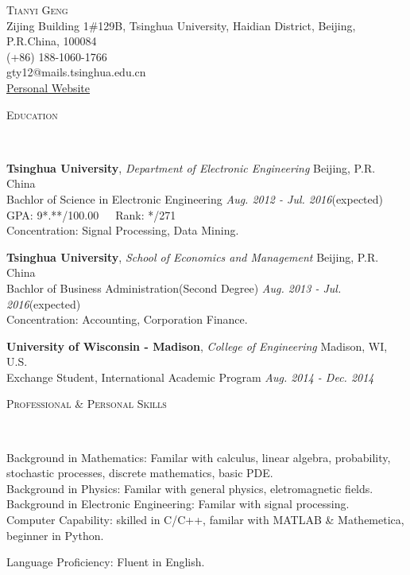 \documentclass[9pt]{article}
\newenvironment{changemargin}[2]{%
  \begin{list}{}{%
    \setlength{\topsep}{0pt}%
    \setlength{\leftmargin}{#1}%
    \setlength{\rightmargin}{#2}%
    \setlength{\listparindent}{\parindent}%
    \setlength{\itemindent}{\parindent}%
    \setlength{\parsep}{\parskip}%
  }%
  \item[]}{\end{list}
}
\newcommand{\lineover}{
	\begin{changemargin}{-0.05in}{-0.05in}
		\vspace*{-8pt}
		\hrulefill \\
		\vspace*{-2pt}
	\end{changemargin}
}
\newcommand{\header}[1]{
	\begin{changemargin}{-0.5in}{-0.5in}
		\scshape{#1}\\
  	\lineover
	\end{changemargin}
}
\newcommand{\contact}[5]{
	\begin{changemargin}{-0.5in}{-0.5in}
		\begin{center}
			{\Large \scshape {#1}}\\ \smallskip
			{#2}\\ \smallskip 
			{#3}\\ \smallskip
			{#4}\\ \smallskip
			{#5}\smallskip
		\end{center}
	\end{changemargin}
}
\newenvironment{body} {
	\vspace*{-16pt}
	\begin{changemargin}{-0.25in}{-0.5in}
  }	
	{\end{changemargin}
}
\begin{document}
\contact{Tianyi Geng}{Zijing Building 1\#129B, Tsinghua University, Haidian District, Beijing, P.R.China, 100084}{(+86) 188-1060-1766}{gty12@mails.tsinghua.edu.cn}{\href{http://TarnumG95.github.io}{Personal Website}}

\smallskip
\smallskip
\smallskip
\smallskip
\header{Education}

\begin{body}
	\vspace{14pt}

	\textbf{Tsinghua University}, \emph{Department of Electronic Engineering} \hfill Beijing, P.R. China \\
Bachlor of Science in Electronic Engineering \hfill \emph{Aug. 2012 - Jul. 2016}(expected){} \\
GPA: 9*.**/100.00\ \ \ Rank: */271\\
Concentration: Signal Processing, Data Mining. \\
\vspace{12pt}

	\textbf{Tsinghua University}, \emph{School of Economics and Management} \hfill Beijing, P.R. China \\
Bachlor of Business Administration(Second Degree) \hfill \emph{Aug. 2013 - Jul. 2016}(expected){} \\
Concentration: Accounting, Corporation Finance. \\
\vspace{12pt}

	\textbf{University of Wisconsin - Madison}, \emph{College of Engineering} \hfill Madison, WI, U.S. \\
Exchange Student, International Academic Program \hfill \emph{Aug. 2014 - Dec. 2014}{} \\

\end{body}

\smallskip
\smallskip

\header{Professional \& Personal Skills}

\begin{body}
	\vspace{14pt}
	Background in Mathematics: Familar with calculus, linear algebra, probability, stochastic processes, discrete mathematics, basic PDE.\\
	\smallskip
	Background in Physics: Familar with general physics, eletromagnetic fields.\\
	\smallskip
	Background in Electronic Engineering: Familar with signal processing.\\
	\smallskip
	Computer Capability: skilled in C/C++, familar with MATLAB \& Mathemetica, beginner in Python.\\
	\smallskip

	Language Proficiency: Fluent in English.\\
\end{body}
\smallskip
\smallskip
\end{document}
